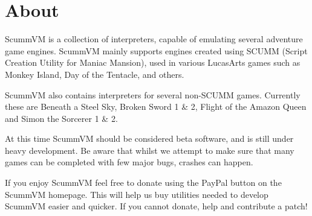 


\section{About}

ScummVM is a collection of interpreters, capable of emulating several
adventure game engines. ScummVM mainly supports engines created using 
SCUMM (Script Creation Utility for Maniac Mansion), used in various
LucasArts games such as Monkey Island, Day of the Tentacle, and others.

ScummVM also contains interpreters for several non-SCUMM games. Currently
these are Beneath a Steel Sky, Broken Sword 1 \& 2, Flight of the Amazon Queen
and Simon the Sorcerer 1 \& 2.

At this time ScummVM should be considered beta software, and is still
under heavy development. Be aware that whilst we attempt to make sure
that many games can be completed with few major bugs, crashes can happen.

If you enjoy ScummVM feel free to donate using the PayPal button on the
ScummVM homepage. This will help us buy utilities needed to develop ScummVM
easier and quicker. If you cannot donate, help and contribute a patch!
